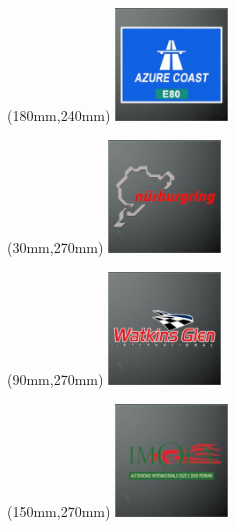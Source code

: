 \begin{textblock*}{30mm}(180mm,240mm)%
\includegraphics[width=30mm]{LG/2015-05-20_00073.png}
\end{textblock*}
\begin{textblock*}{30mm}(30mm,270mm)%
\includegraphics[width=30mm]{LG/2015-05-20_00088.png}
\end{textblock*}
\begin{textblock*}{30mm}(90mm,270mm)%
\includegraphics[width=30mm]{LG/2015-05-20_00097.png}
\end{textblock*}
\begin{textblock*}{30mm}(150mm,270mm)%
\includegraphics[width=30mm]{LG/2015-05-20_00083.png}
\end{textblock*}
